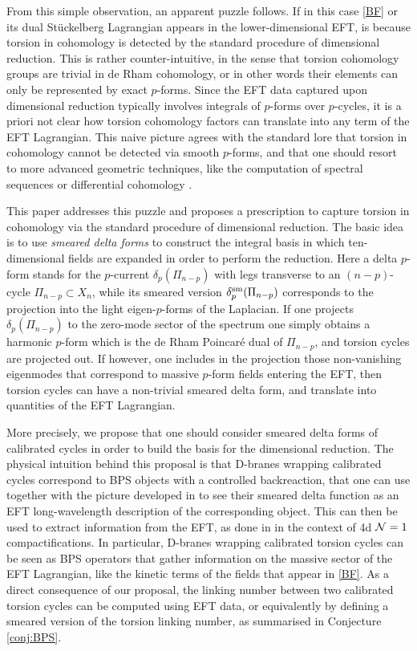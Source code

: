 \documentclass[11pt]{article}
\def\CN {{\cal N}}
\begin{document}
From this simple observation, an apparent puzzle follows. If in this case \eqref{BF} or its dual St\"uckelberg Lagrangian appears in the lower-dimensional EFT, is because torsion in cohomology is detected by the standard procedure of dimensional reduction. This is rather counter-intuitive, in the sense that torsion cohomology groups are trivial in de Rham cohomology, or in other words their elements can only be represented by exact $p$-forms. Since the EFT data captured upon dimensional reduction typically involves integrals of $p$-forms over $p$-cycles, it is a priori not clear how torsion cohomology factors can translate into any term of the EFT Lagrangian. This naive picture agrees with the standard lore that torsion in cohomology cannot be detected via smooth $p$-forms, and that one should resort to more advanced geometric techniques, like the computation of spectral sequences  \cite{Bott1982DifferentialFI} or differential cohomology \cite{Apruzzi:2021nmk}.

This paper addresses this puzzle and proposes a prescription to capture torsion in cohomology via the standard procedure of dimensional reduction. The basic idea is to use {\em smeared delta forms} to construct the integral basis in which ten-dimensional fields are expanded in order to perform the reduction. Here a delta $p$-form stands for the $p$-current $\delta_p(\Pi_{n-p})$ with legs transverse to an $(n-p)$-cycle $\Pi_{n-p} \subset X_n$, while its smeared version $\delta_p^{\rm sm}(\Pi_{n-p})$ corresponds to the projection into the light eigen-$p$-forms of the Laplacian. If one projects $\delta_p(\Pi_{n-p})$ to the zero-mode sector of the spectrum one simply obtains a harmonic $p$-form which is the de Rham Poincar\'e dual of $\Pi_{n-p}$, and torsion cycles are projected out. If however, one includes in the projection those non-vanishing eigenmodes that correspond to massive $p$-form fields entering the EFT, then torsion cycles can have a non-trivial smeared delta form, and translate into quantities of the EFT Lagrangian. 

More precisely, we propose that one should consider smeared delta forms of calibrated cycles in order to build the basis for the dimensional reduction. The physical intuition behind this proposal is that D-branes wrapping calibrated cycles correspond to BPS objects with a controlled backreaction, that one can use together with the picture developed in \cite{Goldberger:2001tn,Michel:2014lva,Polchinski:2015bea} to see their smeared delta function as an EFT long-wavelength description of the corresponding object.  This can then be used to extract information from the EFT, as done in \cite{Lanza:2020qmt,Lanza:2021udy,Lanza:2022zyg} in the context of 4d $\CN=1$ compactifications. In particular, D-branes wrapping calibrated torsion cycles can be seen as BPS operators that gather information on the massive sector of the EFT Lagrangian, like the kinetic terms of the fields that appear in \eqref{BF}. As a direct consequence of our proposal, the linking number between two calibrated torsion cycles can be computed using EFT data, or equivalently by defining a smeared version of the torsion linking number, as summarised in Conjecture \ref{conj:BPS}. 
\end{document}
